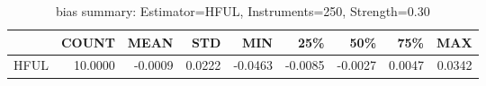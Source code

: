 \begin{table}[ht]
\centering
\caption{bias summary: Estimator=HFUL, Instruments=250, Strength=0.30}
\begin{tabular}{lrrrrrrrr}
\toprule
 & COUNT & MEAN & STD & MIN & 25\% & 50\% & 75\% & MAX \\
\midrule
HFUL & 10.0000 & -0.0009 & 0.0222 & -0.0463 & -0.0085 & -0.0027 & 0.0047 & 0.0342 \\
\bottomrule
\end{tabular}
\end{table}
